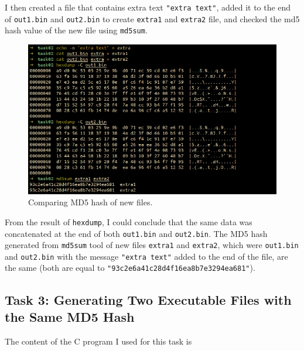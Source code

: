 \documentclass{article}
\begin{document}
I then created a file that contains extra text \texttt{"extra text"}, added it to the
end of \texttt{out1.bin} and \texttt{out2.bin} to create \texttt{extra1} and
\texttt{extra2} file, and checked the md5 hash value of the new file using
\texttt{md5sum}.

\begin{figure}[!ht]
    \centering
    \includegraphics[scale=0.5]{task2.2.png}
    \caption{Comparing MD5 hash of new files.}
\end{figure}

From the result of \texttt{hexdump}, I could conclude that the same data was
concatenated at the end of both \texttt{out1.bin} and \texttt{out2.bin}.
The MD5 hash generated from \texttt{md5sum} tool of new files \texttt{extra1}
and \texttt{extra2}, which were \texttt{out1.bin} and \texttt{out2.bin} with the
message \texttt{"extra text"} added to the end of the file, are the same (both
are equal to \texttt{"93c2e6a41c28d4f16ea8b7e3294ea681"}).

\subsection{Task 3: Generating Two Executable Files with the Same MD5 Hash}

The content of the C program I used for this task is
\end{document}
